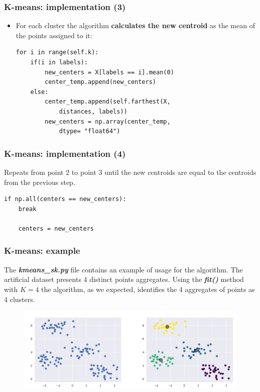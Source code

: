 \documentclass[xcolor ={table,usenames,dvipsnames}]{beamer}
\theoremstyle{definition}
\begin{document}
	\begin{frame}[fragile]
		\frametitle{K-means: implementation (3)}	
		\begin{itemize}
			\item For each cluster the algorithm \textbf{calculates the new centroid} as the mean of the points assigned to it:
			
			\begin{lstlisting}
for i in range(self.k):
	if(i in labels):
		new_centers = X[labels == i].mean(0)
		center_temp.append(new_centers)
	else:
		center_temp.append(self.farthest(X, 
			distances, labels))	
		new_centers = np.array(center_temp,
			dtype= "float64")
			\end{lstlisting}
		\end{itemize}
	\end{frame}

	\begin{frame}[fragile]
		\frametitle{K-means: implementation (4)}
		Repeats from point 2 to point 3 until the new centroids are equal to the centroids from the previous step.
		\begin{lstlisting}
if np.all(centers == new_centers):
	break
		
	centers = new_centers
		\end{lstlisting}
	\end{frame}

	\begin{frame}[fragile]
		\frametitle{K-means: example}
		The \textbf{\textit{kmeans\_sk.py}} file contains an example of usage for the algorithm. The artificial dataset presents 4 distinct points aggregates. Using the \textbf{\textit{fit()}} method with $K = 4$ the algorithm, as we expected, identifies the 4 aggregates of points as 4 clusters.
		
			\begin{figure}[h!]
			\centering
			\includegraphics[scale=0.3]{img/example.png}
		\end{figure}
	\end{frame}
\end{document}
